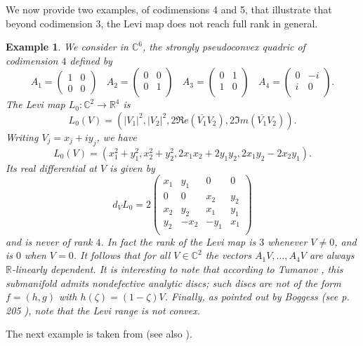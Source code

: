 \documentclass[10pt,a4paper]{amsart}
\newcommand{\C}{\mathbb C}
\newcommand{\R}{\mathbb R}
\newtheorem{example}[theo]{Example}
\numberwithin{equation}{section}
\begin{document}
We now provide two examples, of codimensions 4 and 5,  that illustrate that beyond codimension 3, the Levi map does not reach full rank in general. 

\begin{example}
We consider in $\C^6$, the strongly pseudoconvex quadric of codimension $4$ defined by  
$$A_1=
\begin{pmatrix}
	1& 0  \\ 0 &0  
\end{pmatrix} \ \ \ \ 
A_2=
\begin{pmatrix}
	0 & 0  \\  0 & 1 \\ 
\end{pmatrix}\ \ \ \ 
A_3=
\begin{pmatrix}
	0& 1  \\  1 & 0 \\
\end{pmatrix}\ \ \ \  
A_4=
\begin{pmatrix}
	0& -i  \\ i  & 0 \\
\end{pmatrix}.$$
The Levi map $L_0: \C^2 \to \R^4$ is 
$$L_0(V)=(|V_1|^2,|V_2|^2,2\Re e (\overline{V_1}V_2),2\Im m (\overline{V_1}V_2)).$$ 
Writing $V_j=x_j+iy_j$, we have  
$$L_0(V)=(x_1^2+y_1^2,x_2^2+y_2^2,2x_1x_2+2y_1y_2,2x_1y_2-2x_2y_1).$$  
Its real differential at $V$ is given by 
$$d_VL_0=2
\begin{pmatrix}
x_1& y_1 & 0 & 0     \\ 
0& 0  & x_2 & y_2   \\ 
x_2& y_2 &x_1 & y_1    \\ 
y_2& -x_2 & -y_1 & x_1 \\ 
\end{pmatrix}$$
and is never of rank $4$. In fact the rank of the Levi map is $3$ whenever $V\neq 0$, and is $0$ when $V=0$. It follows that for all $V\in \C^2$ the vectors $A_1V,\ldots,A_4V$ are always $\R$-linearly dependent. It is interesting to note that according to Tumanov \cite{tu3}, this submanifold admits nondefective analytic  discs; such discs are not of the form $f=(h,g)$ with $h(\zeta)=(1-\zeta)V$. Finally, as pointed out by Boggess (see p. 205 \cite{bo}), note that the Levi range is not convex.  
\end{example}


The next example is taken from \cite{me} (see also \cite{gr-me}). 
\end{document}
